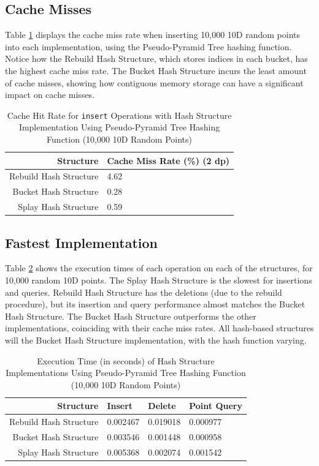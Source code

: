\subsection{Cache Misses}

Table \ref{tab:perf1-cache-hit-rate} displays the cache miss rate when inserting 10,000 10D random points into each implementation, using the Pseudo-Pyramid Tree hashing function. Notice how the Rebuild Hash Structure, which stores indices in each bucket, has the highest cache miss rate. The Bucket Hash Structure incurs the least amount of cache misses, showing how contiguous memory storage can have a significant impact on cache misses.

\begin{table}
	\centering
	\begin{tabular}{|r|l|}
		\hline
		\textbf{Structure} & \textbf{Cache Miss Rate (\%) (2 dp)} \\
		\hline
		Rebuild Hash Structure & 4.62 \\
		Bucket Hash Structure & 0.28 \\
		Splay Hash Structure & 0.59 \\
		\hline
	\end{tabular}
	\caption{Cache Hit Rate for \texttt{insert} Operations with Hash Structure Implementation Using Pseudo-Pyramid Tree Hashing Function (10,000 10D Random Points)}
	\label{tab:perf1-cache-hit-rate}
\end{table}

\subsection{Fastest Implementation}

Table \ref{tab:hash-implementation-speeds} shows the execution times of each operation on each of the structures, for 10,000 random 10D points. The Splay Hash Structure is the slowest for insertions and queries. Rebuild Hash Structure has the deletions (due to the rebuild procedure), but its insertion and query performance almost matches the Bucket Hash Structure. The Bucket Hash Structure outperforms the other implementations, coinciding with their cache miss rates. All hash-based structures will the Bucket Hash Structure implementation, with the hash function varying.

\begin{table}
	\centering
	\begin{tabular}{|r|l|l|l|}
	\hline
	\textbf{Structure} & \textbf{Insert} & \textbf{Delete} & \textbf{Point Query}  \\
	\hline
	Rebuild Hash Structure & 0.002467 & 0.019018 & 0.000977 \\
	Bucket Hash Structure & 0.003546 & 0.001448 & 0.000958 \\
	Splay Hash Structure &  0.005368 & 0.002074 &  0.001542 \\
	\hline
	\end{tabular}
	\caption{Execution Time (in seconds) of Hash Structure Implementations Using Pseudo-Pyramid Tree Hashing Function (10,000 10D Random Points)}
	\label{tab:hash-implementation-speeds}
\end{table}

